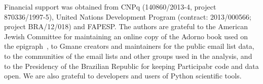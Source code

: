 \documentclass[%
	aip,
	jmp,%
	amsmath,amssymb,
	reprint,%
]{revtex4-1}
\begin{document}

																																																																																					\begin{acknowledgments}
																																																																																						Financial support was obtained from CNPq (140860/2013-4,
																																																																																						project 870336/1997-5), United Nations Development Program (contract: 2013/000566; project BRA/12/018) and FAPESP. 
																																																																																						The authors are grateful to the American Jewish Committee for maintaining an online copy of the Adorno book used on the epigraph~\cite{adorno}, to Gmane creators and maintainers for the public email list data, to the communities of the email lists and other groups used in the analysis, and to the Presidency of the Brazilian Republic for keeping Participabr code and data open.
																																																																																						We are also grateful to developers and users of Python scientific tools.
																																																																																					\end{acknowledgments}

																																																																																					
\end{document}

